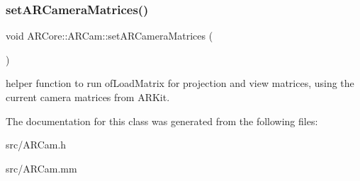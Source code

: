\subsubsection{\texorpdfstring{set\+A\+R\+Camera\+Matrices()}{setARCameraMatrices()}}
{\footnotesize\ttfamily void A\+R\+Core\+::\+A\+R\+Cam\+::set\+A\+R\+Camera\+Matrices (\begin{DoxyParamCaption}{ }\end{DoxyParamCaption})}

helper function to run of\+Load\+Matrix for projection and view matrices, using the current camera matrices from A\+R\+Kit. 

The documentation for this class was generated from the following files\+:\begin{DoxyCompactItemize}
\item 
src/A\+R\+Cam.\+h\item 
src/A\+R\+Cam.\+mm\end{DoxyCompactItemize}
